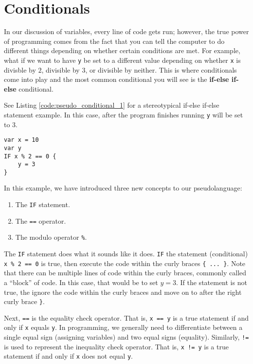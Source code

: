 \documentclass{article}
\begin{document}
\section{Conditionals}

In our discussion of variables, every line of code gets run; however, the true power of programming comes from the fact that you can tell the computer to do different things depending on whether certain conditions are met.
For example, what if we want to have \lstinline{y} be set to a different value depending on whether \lstinline{x} is divisble by $2$, divisible by $3$, or divisible by neither.
This is where conditionals come into play and the most common conditional you will see is the \textbf{if-else if-else} conditional.

See Listing \ref{code:pseudo_conditional_1} for a stereotypical if-else if-else statement example.
In this case, after the program finishes running \lstinline{y} will be set to $3$.
\begin{lstlisting}[caption={A stereotypical IF statement.}, label={code:pseudo_conditional_1}]
var x = 10
var y
IF x % 2 == 0 {
    y = 3
}
\end{lstlisting}
In this example, we have introduced three new concepts to our pseudolanguage:
\begin{enumerate}
\item The \lstinline{IF} statement.
\item The \lstinline{==} operator.
\item The modulo operator \lstinline{%}.
\end{enumerate}
The \lstinline{IF} statement does what it sounds like it does.
\lstinline{IF} the statement (conditional) \lstinline{x % 2 == 0} is true, then execute the code within the curly braces \lstinline|{ ... }|.
Note that there can be multiple lines of code within the curly braces, commonly called a ``block'' of code.
In this case, that would be to set $y = 3$.
If the statement is not true, the ignore the code within the curly braces and move on to after the right curly brace \lstinline|}|.

Next, \lstinline{==} is the equality check operator.
That is, \lstinline{x == y} is a true statement if and only if \lstinline{x} equals \lstinline{y}.
In programming, we generally need to differentiate between a single equal sign (assigning variables) and two equal signs (equality).
Similarly, \lstinline{!=} is used to represent the inequality check operator.
That is, \lstinline{x != y} is a true statement if and only if \lstinline{x} does not equal \lstinline{y}.
\end{document}
